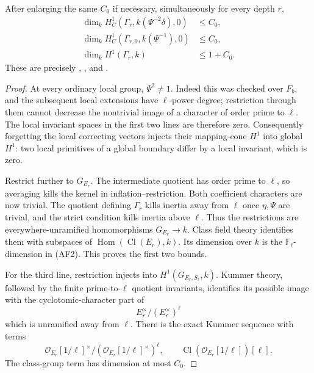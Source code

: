 \begin{srlemma}\label{lem:frame-three-bounds}
After enlarging the same \(C_0\) if necessary,
simultaneously for every depth \(r\),
\[
 \begin{split}
 \dim_kH_C^1(\Gamma_r,k(\Psi^{-2}\delta),0)&\le C_0,\\
 \dim_kH_C^1(\Gamma_{r,0},k(\Psi^{-1}),0)&\le C_0,\\
 \dim_kH^1(\Gamma_r,k)&\le1+C_0 .
 \end{split}                                                 \tag{AF4}
\]
These are precisely ,
, and .
\end{srlemma}
\begin{proof}
At every ordinary local group, \(\Psi^2\ne1\).
Indeed this was checked over \(F_b\), and the subsequent
local extensions have \(\ell\)-power degree; restriction
through them cannot decrease the nontrivial image of a
character of order prime to \(\ell\).
The local invariant spaces in the first two lines are
therefore zero.
Consequently forgetting the local correcting vectors
injects their mapping-cone \(H^1\) into global \(H^1\):
two local primitives of a global boundary differ by a
local invariant, which is zero.

Restrict further to \(G_{E_r}\).
The intermediate quotient has order prime to \(\ell\),
so averaging kills the kernel in inflation--restriction.
Both coefficient characters are now trivial.
The quotient defining \(\Gamma_r\) kills inertia away
from \(\ell\) once \(\eta,\Psi\) are trivial, and the
strict condition kills inertia above \(\ell\).
Thus the restrictions are everywhere-unramified
homomorphisms \(G_{E_r}\to k\).
Class field theory identifies them with subspaces of
\(\operatorname{Hom}(\operatorname{Cl}(E_r),k)\).
Its dimension over \(k\) is the
\(\mathbb F_\ell\)-dimension in (AF2).
This proves the first two bounds.

For the third line, restriction injects into
\(H^1(G_{E_r,S_\ell},k)\).
Kummer theory, followed by the finite prime-to-\(\ell\)
quotient invariants, identifies its possible image
with the cyclotomic-character part of
\[
             E_r^\times/(E_r^\times)^\ell
\]
which is unramified away from \(\ell\).
There is the exact Kummer sequence with terms
\[
 \mathcal O_{E_r}[1/\ell]^\times/
                       (\mathcal O_{E_r}[1/\ell]^\times)^\ell,
 \qquad
 \operatorname{Cl}(\mathcal O_{E_r}[1/\ell])[\ell].
                                                               \tag{AF5}
\]
The class-group term has dimension at most \(C_0\).


\end{proof}
